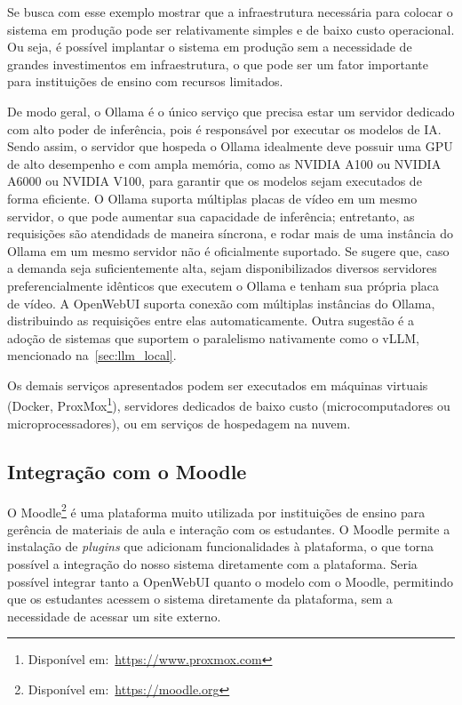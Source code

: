 \documentclass[journal]{IEEEtran}
\begin{document}
Se busca com esse exemplo mostrar que a infraestrutura necessária para colocar o sistema em produção pode ser relativamente simples e de baixo custo operacional.
Ou seja, é possível implantar o sistema em produção sem a necessidade de grandes investimentos em infraestrutura, o que pode ser um fator importante para instituições de ensino com recursos limitados.

De modo geral, o Ollama é o único serviço que precisa estar um servidor dedicado com alto poder de inferência, pois é responsável por executar os modelos de IA\@.
Sendo assim, o servidor que hospeda o Ollama idealmente deve possuir uma GPU de alto desempenho e com ampla memória, como as NVIDIA A100 ou NVIDIA A6000 ou NVIDIA V100, para garantir que os modelos sejam executados de forma eficiente.
O Ollama suporta múltiplas placas de vídeo em um mesmo servidor, o que pode aumentar sua capacidade de inferência;
entretanto, as requisições são atendidads de maneira síncrona, e rodar mais de uma instância do Ollama em um mesmo servidor não é oficialmente suportado.
Se sugere que, caso a demanda seja suficientemente alta, sejam disponibilizados diversos servidores preferencialmente idênticos que executem o Ollama e tenham sua própria placa de vídeo.
A OpenWebUI suporta conexão com múltiplas instâncias do Ollama, distribuindo as requisições entre elas automaticamente.
Outra sugestão é a adoção de sistemas que suportem o paralelismo nativamente como o vLLM, mencionado na~\cref{sec:llm_local}.

Os demais serviços apresentados podem ser executados em máquinas virtuais (Docker, ProxMox\footnote{Disponível em:~\url{https://www.proxmox.com}}), servidores dedicados de baixo custo (microcomputadores ou microprocessadores), ou em serviços de hospedagem na nuvem.

\subsection{Integração com o Moodle}

\noindent%
O Moodle\footnote{Disponível em:~\url{https://moodle.org}} é uma plataforma muito utilizada por instituições de ensino para gerência de materiais de aula e interação com os estudantes.
O Moodle permite a instalação de \textit{plugins} que adicionam funcionalidades à plataforma, o que torna possível a integração do nosso sistema diretamente com a plataforma.
Seria possível integrar tanto a OpenWebUI quanto o modelo com o Moodle, permitindo que os estudantes acessem o sistema diretamente da plataforma, sem a necessidade de acessar um site externo.
\end{document}
